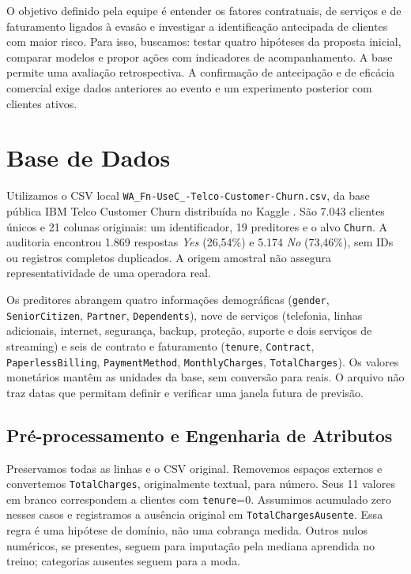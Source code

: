 \documentclass[12pt]{article}
\begin{document}
O objetivo definido pela equipe é entender os fatores contratuais, de serviços e de faturamento ligados à evasão e investigar a identificação antecipada de clientes com maior risco. Para isso, buscamos: testar quatro hipóteses da proposta inicial, comparar modelos e propor ações com indicadores de acompanhamento. A base permite uma avaliação retrospectiva. A confirmação de antecipação e de eficácia comercial exige dados anteriores ao evento e um experimento posterior com clientes ativos.

\section{Base de Dados}\label{sec:base}
Utilizamos o CSV local \texttt{WA\_Fn-UseC\_-Telco-Customer-Churn.csv}, da base pública IBM Telco Customer Churn distribuída no Kaggle \cite{telco}. São 7.043 clientes únicos e 21 colunas originais: um identificador, 19 preditores e o alvo \texttt{Churn}. A auditoria encontrou 1.869 respostas \textit{Yes} (26,54\%) e 5.174 \textit{No} (73,46\%), sem IDs ou registros completos duplicados. A origem amostral não assegura representatividade de uma operadora real.

Os preditores abrangem quatro informações demográficas (\texttt{gender}, \texttt{SeniorCitizen}, \texttt{Partner}, \texttt{Dependents}), nove de serviços (telefonia, linhas adicionais, internet, segurança, backup, proteção, suporte e dois serviços de streaming) e seis de contrato e faturamento (\texttt{tenure}, \texttt{Contract}, \texttt{PaperlessBilling}, \texttt{PaymentMethod}, \texttt{MonthlyCharges}, \texttt{TotalCharges}). Os valores monetários mantêm as unidades da base, sem conversão para reais. O arquivo não traz datas que permitam definir e verificar uma janela futura de previsão.

\subsection{Pré-processamento e Engenharia de Atributos}
Preservamos todas as linhas e o CSV original. Removemos espaços externos e convertemos \texttt{TotalCharges}, originalmente textual, para número. Seus 11 valores em branco correspondem a clientes com \texttt{tenure}=0. Assumimos acumulado zero nesses casos e registramos a ausência original em \texttt{TotalChargesAusente}. Essa regra é uma hipótese de domínio, não uma cobrança medida. Outros nulos numéricos, se presentes, seguem para imputação pela mediana aprendida no treino; categorias ausentes seguem para a moda.
\end{document}

